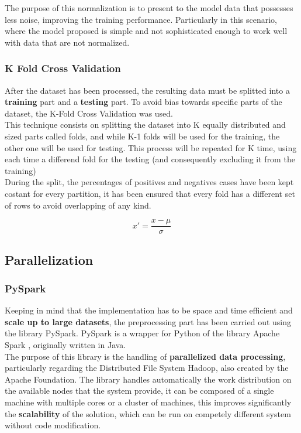 \documentclass[
	letterpaper, %
	10pt, %
]{class}
\begin{document}
The purpose of this normalization is to present to the model data that possesses less noise, improving the training performance. Particularly in this scenario, where the model proposed is simple and not sophisticated enough to work well with data that are not normalized.

\subsubsection{K Fold Cross Validation}
After the dataset has been processed, the resulting data must be splitted into a \textbf{training} part and a \textbf{testing} part. To avoid bias towards specific parts of the dataset, the K-Fold Cross Validation \cite{crossvalidation} was used.\\

This technique consists on splitting the dataset into K equally distributed and sized parts called folds, and while K-1 folds will be used for the training, the other one will be used for testing. This process will be repeated for K time, using each time a differend fold for the testing (and consequently excluding it from the training)\\

During the split, the percentages of positives and negatives cases have been kept costant for every partition, it has been ensured that every fold has a different set of rows to avoid overlapping of any kind.

$$ x' = \frac{x - \mu}{\sigma} $$

\subsection{Parallelization}

\subsubsection{PySpark}
Keeping in mind that the implementation has to be space and time efficient and \textbf{scale up to large datasets}, the preprocessing part has been carried out using the library PySpark.
PySpark is a wrapper for Python of the library Apache Spark \cite{spark}, originally written in Java.\\

The purpose of this library is the handling of \textbf{parallelized data processing}, particularly regarding the Distributed File System Hadoop, also created by the Apache Foundation.
The library handles automatically the work distribution on the available nodes that the system provide, it can be composed of a single machine with multiple cores or a cluster of machines, this improves significantly the \textbf{scalability} of the solution, which can be run on competely different system without code modification.\\
\end{document}
